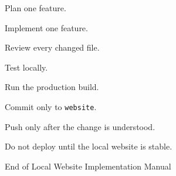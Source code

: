 \documentclass[11pt,letterpaper]{article}
\newcommand{\DocumentTitle}{Local Website Implementation Manual}
\newcommand{\branchname}[1]{\texttt{#1}}
\begin{document}
\begin{tcolorbox}[
    enhanced,
    breakable,
    colback=CUNavy,
    colframe=CUGold,
    coltitle=CUNavy,
    colbacktitle=CUGoldLight,
    boxrule=1pt,
    arc=2mm,
    title=\textbf{Controlled Development Rule}
]
\color{white}

Plan one feature.

Implement one feature.

Review every changed file.

Test locally.

Run the production build.

Commit only to \branchname{website}.

Push only after the change is understood.

Do not deploy until the local website is stable.

\end{tcolorbox}

\vfill

\begin{center}
\color{CUMuted}
\small
End of \DocumentTitle
\end{center}
\end{document}
